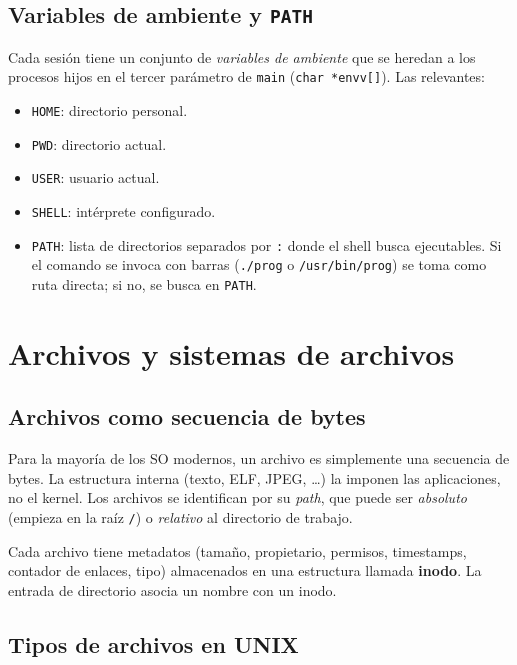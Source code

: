 \documentclass[11pt,a4paper]{article}
\begin{document}
\subsection{Variables de ambiente y \texttt{PATH}}

Cada sesión tiene un conjunto de \emph{variables de ambiente} que se
heredan a los procesos hijos en el tercer parámetro de \texttt{main}
(\texttt{char *envv[]}). Las relevantes:

\begin{itemize}[leftmargin=*]
    \item \texttt{HOME}: directorio personal.
    \item \texttt{PWD}: directorio actual.
    \item \texttt{USER}: usuario actual.
    \item \texttt{SHELL}: intérprete configurado.
    \item \texttt{PATH}: lista de directorios separados por
        \texttt{:} donde el shell busca ejecutables. Si el comando se
        invoca con barras (\texttt{./prog} o \texttt{/usr/bin/prog}) se
        toma como ruta directa; si no, se busca en \texttt{PATH}.
\end{itemize}

\section{Archivos y sistemas de archivos}

\subsection{Archivos como secuencia de bytes}

Para la mayoría de los SO modernos, un archivo es simplemente una
secuencia de bytes. La estructura interna (texto, ELF, JPEG, \ldots)
la imponen las aplicaciones, no el kernel. Los archivos se identifican
por su \emph{path}, que puede ser \emph{absoluto} (empieza en la raíz
\texttt{/}) o \emph{relativo} al directorio de trabajo.

Cada archivo tiene metadatos (tamaño, propietario, permisos,
timestamps, contador de enlaces, tipo) almacenados en una estructura
llamada \textbf{inodo}. La entrada de directorio asocia un nombre con
un inodo.

\subsection{Tipos de archivos en UNIX}
\end{document}

